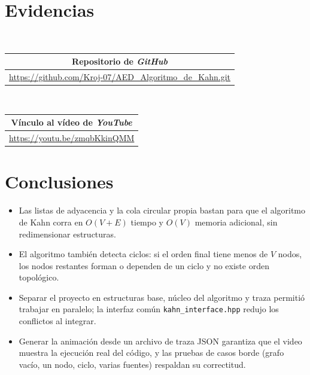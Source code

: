 \documentclass[a4paper, table]{article}
\begin{document}
\section{Evidencias}

\begin{table}[H]
        \centering
        
        \Large \\ [1em]
        
        \begin{tabular}{|c|} 
            \hline \textbf{Repositorio de \textit{GitHub}} \\
            \hline \url{https://github.com/Kroj-07/AED_Algoritmo_de_Kahn.git} \\ \hline
        \end{tabular}

            \\[1em]

        \begin{tabular}{|c|} 
            \hline \textbf{Vínculo al vídeo de \textit{YouTube}} \\
            \hline \url{https://youtu.be/zmqbKkinQMM} \\ \hline
        \end{tabular}
    
    \end{table}

\section{Conclusiones}

\begin{itemize}
    \item Las listas de adyacencia y la cola circular propia bastan para que el algoritmo de Kahn corra en $O(V+E)$ tiempo y $O(V)$ memoria adicional, sin redimensionar estructuras.

    \item El algoritmo también detecta ciclos: si el orden final tiene menos de $V$ nodos, los nodos restantes forman o dependen de un ciclo y no existe orden topológico.

    \item Separar el proyecto en estructuras base, núcleo del algoritmo y traza permitió trabajar en paralelo; la interfaz común \texttt{kahn\_interface.hpp} redujo los conflictos al integrar.

    \item Generar la animación desde un archivo de traza JSON garantiza que el video muestra la ejecución real del código, y las pruebas de casos borde (grafo vacío, un nodo, ciclo, varias fuentes) respaldan su correctitud.
\end{itemize}
\end{document}
